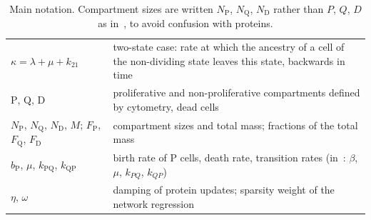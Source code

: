 \documentclass[a4paper, 11pt]{article}
\newcommand{\cP}{\mathrm{P}}
\newcommand{\cQ}{\mathrm{Q}}
\newcommand{\cD}{\mathrm{D}}
\theoremstyle{plain}
\theoremstyle{remark}
\begin{document}
\begin{table}[!t]
\begin{tabular}{p{4.2cm}p{10.6cm}}
$\kappa = \lambda + \mu + k_{21}$ & two-state case: rate at which the ancestry of a cell of the non-dividing state leaves this state, backwards in time \\
$\cP$, $\cQ$, $\cD$ & proliferative and non-proliferative compartments defined by cytometry, dead cells \\
$N_\cP$, $N_\cQ$, $N_\cD$, $M$; $F_\cP$, $F_\cQ$, $F_\cD$ & compartment sizes and total mass; fractions of the total mass \\
$b_\cP$, $\mu$, $k_{\cP\cQ}$, $k_{\cQ\cP}$ & birth rate of $\cP$ cells, death rate, transition rates (in~\cite{rmsbio}: $\beta$, $\mu$, $k_{PQ}$, $k_{QP}$) \\
$\eta$, $\omega$ & damping of protein updates; sparsity weight of the network regression \\
\bottomrule
\end{tabular}
\caption{Main notation. Compartment sizes are written $N_\cP$, $N_\cQ$, $N_\cD$ rather than $P$, $Q$, $D$ as in~\cite{rmsbio}, to avoid confusion with proteins.}
\label{tab:notation}
\end{table}

\clearpage

\begin{abstract}
Single-cell RNA-seq snapshots of a self-renewing population carry more dynamical information than they seem to. When cells divide, die and switch between states at different rates, the stationarity of the population forces a flux of cells between states, and the hidden protein levels of each cell keep a trace of the states visited by its ancestors. We turn this observation into CardamomOT-stat, a method that infers a mechanistic gene regulatory network (GRN) and the hidden protein levels of every cell from a single snapshot of a population in balanced growth. As in StationaryOT, a growth step followed by a transport step defines the probable ancestors of each observed cell; here, the transport cost is the mechanistic bridge cost of CardamomOT, and protein levels follow from a linear system along the ancestry, whose limit for short steps is a resolvent of the backward generator. As in CardamomOT, the coupling, the protein levels and the network are updated in turn. Two effects of proliferation shape protein levels: dilution by growth, which compresses the proteins of dividing cells, and an ancestral lag, which makes the proteins reflect the state of their recent ancestors. The application is a patient-derived fusion-negative rhabdomyosarcoma tumoroid model without drug, whose stationarity is supported by cytometry, and whose population dynamics, calibrated on cytometry, growth curves and regrowth experiments, anchors the per-cell rates estimated from gene signatures.
\end{abstract}
\end{document}
